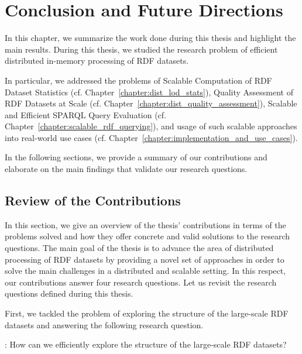 \chapter{Conclusion and Future Directions}
\label{chapter:conclusion}

In this chapter, we summarize the work done during this thesis and highlight the main results.
During this thesis, we studied the research problem of efficient distributed in-memory processing of \gls{RDF} datasets.

In particular, we addressed the problems of Scalable Computation of \gls{RDF} Dataset Statistics (cf. Chapter~\ref{chapter:dist_lod_stats}), Quality Assessment of \gls{RDF} Datasets at Scale (cf. Chapter~\ref{chapter:dist_quality_assessment}), Scalable and Efficient \gls{SPARQL} Query Evaluation (cf. Chapter~\ref{chapter:scalable_rdf_querying}), and usage of such scalable approaches into real-world use cases (cf. Chapter~\ref{chapter:implementation_and_use_cases}).

In the following sections, we provide a summary of our contributions and elaborate on the main findings that validate our research questions.

\section{Review of the Contributions}
In this section, we give an overview of the thesis' contributions in terms of the problems solved and how they offer concrete and valid solutions to the research questions.
The main goal of the thesis is to advance the area of distributed processing of \gls{RDF} datasets by providing a novel set of approaches in order to solve the main challenges in a distributed and scalable setting.
In this respect, our contributions answer four research questions.
Let us revisit the research questions defined during this thesis.

First, we tackled the problem of exploring the structure of the large-scale \gls{RDF} datasets and answering the following research question.

\begin{tcolorbox}
\textbf{\rqNr[RQ1]\label{rqc:1}}: How can we efficiently explore the structure of the large-scale \gls{RDF} datasets?
\end{tcolorbox}

